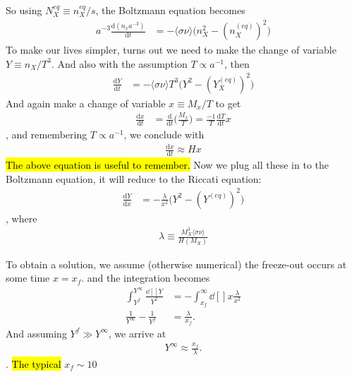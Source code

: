 \documentclass[a4paper, 12pt]{article}
\begin{document}
{{  So using \( N_{X}^{eq} \equiv n_{X}^{eq}/s \), the Boltzmann equation
  becomes
  \begin{align}
    \label{WIMP Boltzmann}
    a^{-3} \frac{\mathrm{d}(n_x a^{-3} )}{\mathrm{d}t} &= - \langle
    \sigma \nu \rangle \bigg( n_{X}^{2} - (n_{X}^{(eq)})^2 \bigg) 
  \end{align}
  To make our lives simpler, turns out we need to make the change of
  variable \( Y \equiv n_X / T^3 \). And also with the assumption
  \( T \propto a^{-1}  \), then 
  \begin{align}
    \label{change to Y WIMP Boltzmann }
   \frac{\mathrm{d}Y}{\mathrm{d}t} &= - \langle \sigma \nu \rangle
    T^{3} \bigg( Y^2 - (Y_{X}^{(eq)})^2 \bigg)  
  \end{align}
  And again make a change of variable \( x \equiv M_x /T \) to get 
  \begin{align}
    \label{change to x}
    \frac{\mathrm{d}x}{\mathrm{d}t} &=
    \frac{\mathrm{d}}{\mathrm{d}t} \bigg( \frac{M_x}{T} \bigg) =
    \frac{-1}{T} \frac{\mathrm{d}T}{\mathrm{d}t}x
  \end{align}, and remembering \( T \propto a^{-1}  \), we conclude
  with 
  \begin{align}
    \label{ooof}
    \frac{\mathrm{d}x}{\mathrm{d}t} \approx H x
  \end{align}
\hl{The above equation is useful to remember.}  
Now we plug all these in to the Boltzmann equation, it will reduce to
the Riccati equation: 
\begin{align}
  \label{Riccati equation}
  \frac{\mathrm{d}Y}{\mathrm{d}x} &=  - \frac{\lambda}{x^2} \bigg( Y^2
  - (Y^{(eq)})^2\bigg)  
\end{align}, where 
\begin{align}
  \label{lambdaaaa}
  \lambda \equiv \frac{M_{X}^{3} \langle \sigma \nu \rangle  }{H(M_X)}
\end{align}

To obtain a solution, we assume (otherwise numerical) the freeze-out occurs
at some time \(  x = x_f \). and the integration becomes 
\begin{align}
  \label{integration of Riccati equation}
  \int_{Y^f}^{Y^{\infty}} \frac{\dd[]{Y}}{Y^2} &=  -
  \int_{x_f}^{\infty} \dd[]{}x \frac{\lambda}{x^2} \\ 
  \frac{1}{Y^{\infty}} - \frac{1}{Y^f} &= \frac{\lambda}{x_f}. 
\end{align}
And assuming \( Y^f \gg Y^{\infty} \), 
we arrive at 
\begin{align}
  \label{solution to Riccati equation}
  Y^{\infty} \approx \frac{x_f}{\lambda}. 
\end{align}. \hl{The typical } \( x_f \sim 10 \)   

}}
\end{document}
